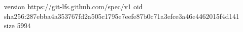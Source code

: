 version https://git-lfs.github.com/spec/v1
oid sha256:287ebba4a353767fd2a505c1795e7eefe87b0c71a3efce3a46e4462015f4d141
size 5994
